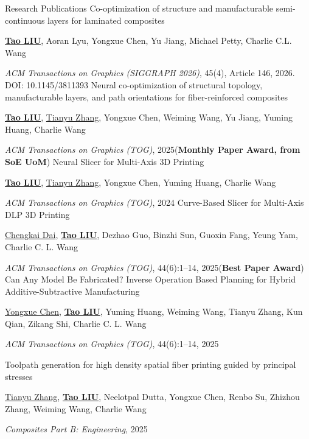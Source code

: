 \begin{rubric}{Research Publications}
\entry*[]
	[17] Co-optimization of structure and manufacturable semi-continuous layers for laminated composites
	\par \underline{\textbf{Tao LIU}}, Aoran Lyu, Yongxue Chen, Yu Jiang, Michael Petty, Charlie C.L. Wang
	\par \textit{ACM Transactions on Graphics (SIGGRAPH 2026)}, 45(4), Article 146, 2026. DOI: 10.1145/3811393
%
\entry*[]
	[16] Neural co-optimization of structural topology, manufacturable layers, and path orientations for fiber-reinforced composites
	\par \underline{\textbf{Tao LIU}}, \underline{Tianyu Zhang}, Yongxue Chen, Weiming Wang, Yu Jiang, Yuming Huang, Charlie Wang
	\par \textit{ACM Transactions on Graphics (TOG)}, 2025(\textbf{Monthly Paper Award, from SoE UoM})
%
\entry*[]
	[15] Neural Slicer for Multi-Axis 3D Printing
	\par \underline{\textbf{Tao LIU}}, \underline{Tianyu Zhang}, Yongxue Chen, Yuming Huang, Charlie Wang
	\par \textit{ACM Transactions on Graphics (TOG)}, 2024
%
\entry*[]
	[14] Curve-Based Slicer for Multi-Axis DLP 3D Printing
	\par \underline{Chengkai Dai}, \underline{\textbf{Tao LIU}}, Dezhao Guo, Binzhi Sun, Guoxin Fang, Yeung Yam, Charlie C. L. Wang 
	\par \textit{ACM Transactions on Graphics (TOG)}, 44(6):1--14, 2025(\textbf{Best Paper Award})
%
\entry*[]
	[13] Can Any Model Be Fabricated? Inverse Operation Based Planning for Hybrid Additive-Subtractive Manufacturing
	\par \underline{Yongxue Chen}, \underline{\textbf{Tao LIU}}, Yuming Huang, Weiming Wang, Tianyu Zhang, Kun Qian, Zikang Shi, Charlie C. L. Wang
	\par \textit{ACM Transactions on Graphics (TOG)}, 44(6):1--14, 2025

\entry*[]
	[12] Toolpath generation for high density spatial fiber printing guided by principal stresses
	\par \underline{Tianyu Zhang}, \underline{\textbf{Tao LIU}}, Neelotpal Dutta, Yongxue Chen, Renbo Su, Zhizhou Zhang, Weiming Wang, Charlie Wang
	\par \textit{Composites Part B: Engineering}, 2025


\end{rubric}
